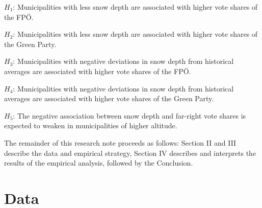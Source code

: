 \documentclass{article}
\begin{document}
\noindent $H_1$: Municipalities with less snow depth are associated with higher vote shares of the FPÖ.

\vspace{0.5em}
\noindent $H_2$: Municipalities with less snow depth are associated with higher vote shares of the Green Party.

\vspace{0.5em}
\noindent $H_3$: Municipalities with negative deviations in snow depth from historical averages are associated with higher vote shares of the FPÖ.

\vspace{0.5em}
\noindent $H_4$: Municipalities with negative deviations in snow depth from historical averages are associated with higher vote shares of the Green Party.

\vspace{0.5em}
\noindent $H_5$: The negative association between snow depth and far-right vote shares is expected to weaken in municipalities of higher altitude.

The remainder of this research note proceeds as follows: Section II and III  describe the data and empirical strategy, Section IV describes and interprets the results of the empirical analysis, followed by the Conclusion. 

\vspace{2em}

\section{Data}
\end{document}
